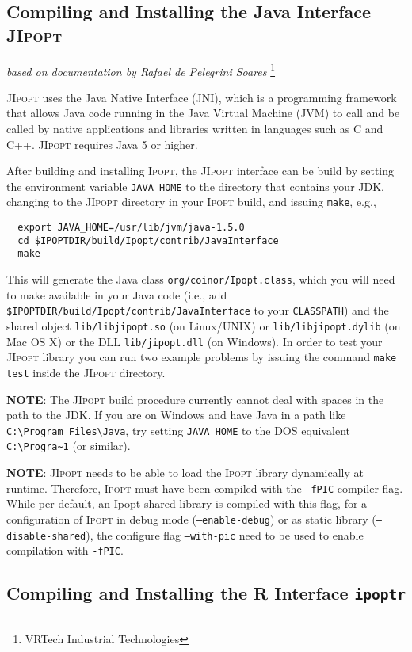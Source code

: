\documentclass[10pt]{article}
\newcommand{\Ipopt}{\textsc{Ipopt}\xspace}
\newcommand{\JIpopt}{\textsc{JIpopt}\xspace}
\newcommand{\ipoptr}{\texttt{ipoptr}\xspace}
\begin{document}
\subsection{Compiling and Installing the Java Interface \JIpopt}  
\label{sec.jipopt.build}
\hfill \textit{based on documentation by Rafael de Pelegrini Soares}%
\footnote{VRTech Industrial Technologies}
\medskip

\JIpopt uses the Java Native Interface (JNI), which is a programming framework 
that allows Java code running in the Java Virtual Machine (JVM) to call and be 
called by native applications and libraries written in languages such as C and 
C++.
\JIpopt requires Java 5 or higher.

After building and installing \Ipopt, the \JIpopt interface can be build by 
setting the environment variable {\tt JAVA\_HOME} to the directory that 
contains your JDK, changing to the \JIpopt directory in your \Ipopt build, and 
issuing {\tt make}, e.g.,
\begin{verbatim}
  export JAVA_HOME=/usr/lib/jvm/java-1.5.0
  cd $IPOPTDIR/build/Ipopt/contrib/JavaInterface
  make
\end{verbatim}

This will generate the Java class {\tt org/coinor/Ipopt.class}, which you will 
need to make available in your Java code (i.e., add {\tt \$IPOPTDIR/build/Ipopt/contrib/JavaInterface}
to your {\tt CLASSPATH}) and the shared object
{\tt lib/libjipopt.so} (on Linux/UNIX) or {\tt lib/libjipopt.dylib} (on Mac OS 
X) or the DLL {\tt lib/jipopt.dll} (on Windows).
In order to test your \JIpopt library you can run two example problems by 
issuing the command {\tt make test} inside the \JIpopt directory.

\textbf{NOTE}: The \JIpopt build procedure currently cannot deal with spaces 
in the path to the JDK. If you are on Windows and have Java in a path like 
\verb|C:\Program Files\Java|, try setting {\tt JAVA\_HOME} to the DOS 
equivalent \verb|C:\Progra~1| (or similar).

\textbf{NOTE}: \JIpopt needs to be able to load the \Ipopt library dynamically 
at runtime. Therefore, \Ipopt must have been compiled with the {\tt -fPIC} 
compiler flag. While per default, an Ipopt shared library is compiled with 
this flag, for a configuration of \Ipopt in debug mode ({\tt --enable-debug}) 
or as static library ({\tt --disable-shared}), the configure flag
{\tt --with-pic} need to be used to enable compilation with {\tt -fPIC}.

\subsection{Compiling and Installing the R Interface \ipoptr} 
\label{sec.ipoptr.build}
\end{document}
